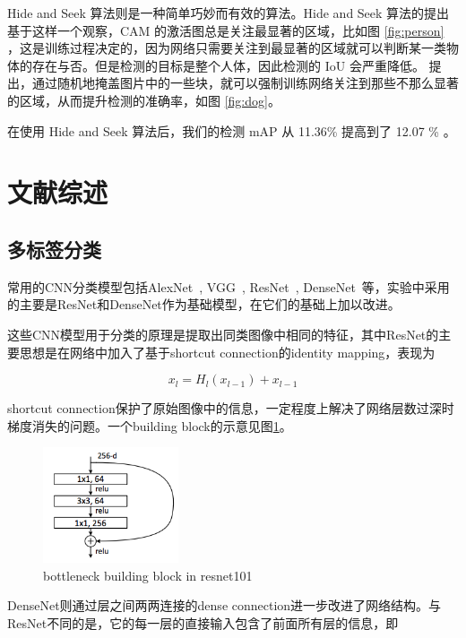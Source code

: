 \documentclass[a4paper]{ctexart}
\begin{document}
Hide and Seek 算法则是一种简单巧妙而有效的算法。Hide and Seek 算法的提出基于这样一个观察，CAM 的激活图总是关注最显著的区域，比如图 \ref{fig:person} ，这是训练过程决定的，因为网络只需要关注到最显著的区域就可以判断某一类物体的存在与否。但是检测的目标是整个人体，因此检测的 IoU 会严重降低。\cite{singh2017hide} 提出，通过随机地掩盖图片中的一些块，就可以强制训练网络关注到那些不那么显著的区域，从而提升检测的准确率，如图 \ref{fig:dog}。

在使用 Hide and Seek 算法后，我们的检测 mAP 从 11.36\% 提高到了 12.07 \% 。

\section{文献综述}
\subsection{多标签分类}
常用的CNN分类模型包括AlexNet~\cite{krizhevsky2012imagenet}, VGG~\cite{simonyan2014very}, ResNet~\cite{he2016deep}, DenseNet~\cite{huang2017densely}等，实验中采用的主要是ResNet和DenseNet作为基础模型，在它们的基础上加以改进。

这些CNN模型用于分类的原理是提取出同类图像中相同的特征，其中ResNet的主要思想是在网络中加入了基于shortcut connection的identity mapping，表现为

    \begin{equation}
        x_l = H_l(x_{l-1}) + x_{l-1}
    \end{equation}

shortcut connection保护了原始图像中的信息，一定程度上解决了网络层数过深时梯度消失的问题。一个building block的示意见图\ref{fig:bottleneck building block in resnet101}。

	\begin{figure}[t]
		\small
		\centering
		\includegraphics[width=4cm]{resnet.png}
		\caption{bottleneck building block in resnet101}
		\label{fig:bottleneck building block in resnet101}
	\end{figure}

DenseNet则通过层之间两两连接的dense connection进一步改进了网络结构。与ResNet不同的是，它的每一层的直接输入包含了前面所有层的信息，即
\end{document}
